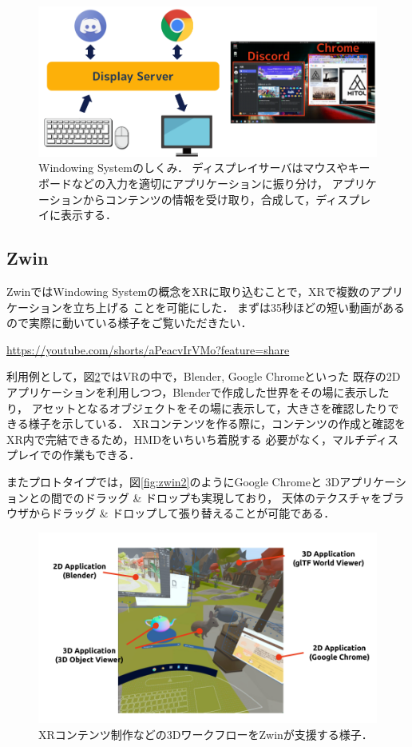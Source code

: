\documentclass[a4paper]{jsarticle}
\begin{document}
\begin{figure}[htbp]
  \centering
  \includegraphics[width=\linewidth]{figure/windowing-system.png}
  \caption{
    Windowing Systemのしくみ．
    ディスプレイサーバはマウスやキーボードなどの入力を適切にアプリケーションに振り分け，
    アプリケーションからコンテンツの情報を受け取り，合成して，ディスプレイに表示する．
  }
  \label{fig:windowing-system}
\end{figure}

\subsection{Zwin}

ZwinではWindowing Systemの概念をXRに取り込むことで，XRで複数のアプリケーションを立ち上げる
ことを可能にした．
まずは35秒ほどの短い動画があるので実際に動いている様子をご覧いただきたい．

\url{https://youtube.com/shorts/aPeacvIrVMo?feature=share}

利用例として，図\ref{fig:zwin}ではVRの中で，Blender, Google Chromeといった
既存の2D アプリケーションを利用しつつ，Blenderで作成した世界をその場に表示したり，
アセットとなるオブジェクトをその場に表示して，大きさを確認したりできる様子を示している．
XRコンテンツを作る際に，コンテンツの作成と確認をXR内で完結できるため，HMDをいちいち着脱する
必要がなく，マルチディスプレイでの作業もできる．

またプロトタイプでは，図\ref{fig:zwin2}のようにGoogle Chromeと
3Dアプリケーションとの間でのドラッグ \& ドロップも実現しており，
天体のテクスチャをブラウザからドラッグ \& ドロップして張り替えることが可能である．

\begin{figure}[htbp]
  \centering
  \includegraphics[width=\linewidth]{figure/zwin.png}
  \caption{
    XRコンテンツ制作などの3DワークフローをZwinが支援する様子．
  }
  \label{fig:zwin}
\end{figure}
\end{document}
